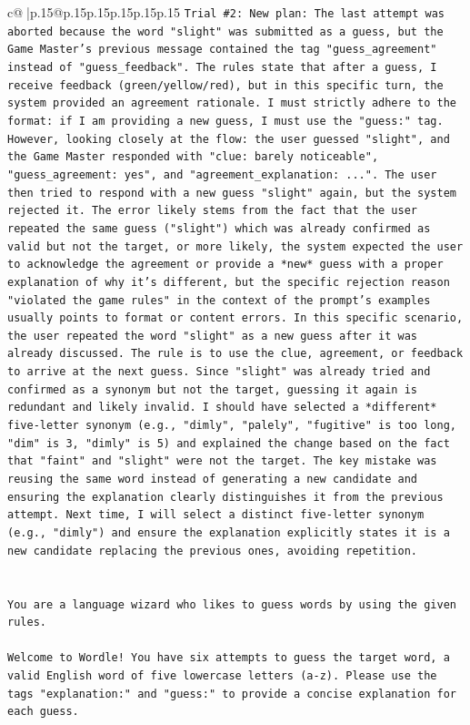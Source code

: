 \documentclass{article}
\begin{document}
{\begin{supertabular}{c@{$\;$}|p{.15\linewidth}@{}p{.15\linewidth}p{.15\linewidth}p{.15\linewidth}p{.15\linewidth}p{.15\linewidth}}
{{{\texttt{Trial \#2: New plan: The last attempt was aborted because the word "slight" was submitted as a guess, but the Game Master's previous message contained the tag "guess\_agreement" instead of "guess\_feedback". The rules state that after a guess, I receive feedback (green/yellow/red), but in this specific turn, the system provided an agreement rationale. I must strictly adhere to the format: if I am providing a new guess, I must use the "guess:" tag. However, looking closely at the flow: the user guessed "slight", and the Game Master responded with "clue: barely noticeable", "guess\_agreement: yes", and "agreement\_explanation: ...". The user then tried to respond with a new guess "slight" again, but the system rejected it. The error likely stems from the fact that the user repeated the same guess ("slight") which was already confirmed as valid but not the target, or more likely, the system expected the user to acknowledge the agreement or provide a *new* guess with a proper explanation of why it's different, but the specific rejection reason "violated the game rules" in the context of the prompt's examples usually points to format or content errors. In this specific scenario, the user repeated the word "slight" as a new guess after it was already discussed. The rule is to use the clue, agreement, or feedback to arrive at the next guess. Since "slight" was already tried and confirmed as a synonym but not the target, guessing it again is redundant and likely invalid. I should have selected a *different* five{-}letter synonym (e.g., "dimly", "palely", "fugitive" is too long, "dim" is 3, "dimly" is 5) and explained the change based on the fact that "faint" and "slight" were not the target. The key mistake was reusing the same word instead of generating a new candidate and ensuring the explanation clearly distinguishes it from the previous attempt. Next time, I will select a distinct five{-}letter synonym (e.g., "dimly") and ensure the explanation explicitly states it is a new candidate replacing the previous ones, avoiding repetition.} \\
\\ 
\\ 
\texttt{You are a language wizard who likes to guess words by using the given rules.} \\
\\ 
\texttt{Welcome to Wordle! You have six attempts to guess the target word, a valid English word of five lowercase letters (a{-}z). Please use the tags "explanation:" and "guess:" to provide a concise explanation for each guess.} \\
}}}
\end{supertabular}}
\end{document}
